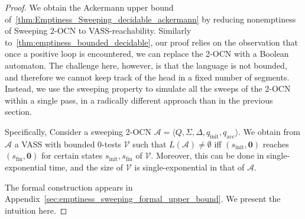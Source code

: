 \documentclass[11pt,a4paper]{amsart}
\newtheorem{lemma}[theorem]{Lemma}
\theoremstyle{definition}
\newcommand{\tup}[1]{\langle #1 \rangle}
\newcommand{\initstate}{q_{\mathrm{init}}}
\newcommand{\accstate}{q_{\mathrm{acc}}}
\renewcommand{\vec}[1]{\boldsymbol{#1}}
\newcommand{\cA}{\mathcal{A}}
\newcommand{\cV}{\mathcal{V}}
\begin{document}
\begin{proof}
	We obtain the Ackermann upper bound
	of~\cref{thm:Emptiness_Sweeping_decidable_ackermann} by reducing nonemptiness of
	Sweeping 2-OCN to VASS-reachability. Similarly
	to~\cref{thm:emptiness_bounded_decidable}, our proof relies on the observation
	that once a positive loop is encountered, we can replace the 2-OCN with a
	Boolean automaton. The challenge here, however, is that the language
	is not bounded, and therefore we cannot keep track of the head in a fixed number
	of segments. Instead, we use the sweeping property to simulate all the sweeps of
	the 2-OCN within a single pass, in a radically different approach than in the
	previous section.
	
	Specifically, 
	Consider a sweeping 2-OCN $\cA=\tup{Q,\Sigma,\Delta,\initstate,\accstate}$. We obtain from $\cA$ a VASS with bounded 0-tests $\cV$ such that $L(\cA)\neq \emptyset$ iff
	$(s_{\mathrm{init}},\vec{0})$ reaches $(s_{\mathrm{fin}},\vec{0})$ for
	certain states $s_{\mathrm{init}},s_{\mathrm{fin}}$ of $\cV$. Moreover, this
	can be done in single-exponential time, and the size of $\cV$ is single-exponential
	in that of $\cA$.
	
	
	The formal construction appears in Appendix~\ref{sec:emptiness_sweeping_formal_upper_bound}. We present the intuition here.

\end{proof}
\end{document}

